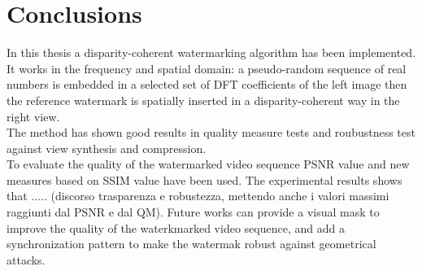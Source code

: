 \chapter{Conclusions}
\label{concl}

In this thesis a disparity-coherent watermarking algorithm has been implemented. It works in the frequency and spatial domain: a pseudo-random sequence of real numbers is embedded in a selected set of DFT coefficients of the left image then the reference watermark is spatially inserted in a disparity-coherent way in the right view.\\
The method has shown good results in quality measure tests and roubustness test against view synthesis and compression.\\
To evaluate the quality of the watermarked video sequence PSNR value and new measures based on SSIM value have been used. The experimental results shows that ..... (discorso trasparenza e robustezza, mettendo anche i valori massimi raggiunti dal PSNR e dal QM).
Future works can provide a visual mask to improve the quality of the waterkmarked video sequence, and add a synchronization pattern to make the watermak robust against geometrical attacks.



